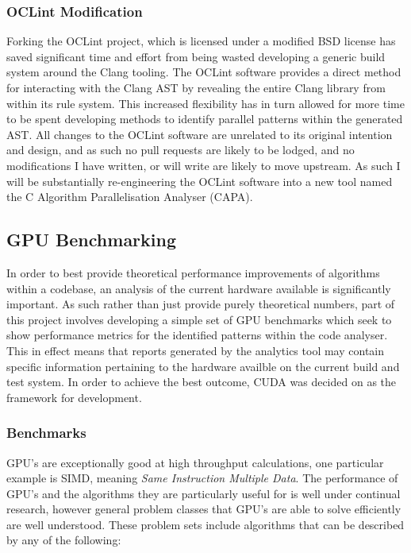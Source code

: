 \subsubsection{OCLint Modification}
Forking the OCLint project, which is licensed under a modified BSD license has saved significant time and effort from being wasted developing a generic build system around the Clang tooling. The OCLint software provides a direct method for interacting with the Clang AST by revealing the entire Clang library from within its rule system. This increased flexibility has in turn allowed for more time to be spent developing methods to identify parallel patterns within the generated AST. All changes to the OCLint software are unrelated to its original intention and design, and as such no pull requests are likely to be lodged, and no modifications I have written, or will write are likely to move upstream. As such I will be substantially re-engineering the OCLint software into a new tool named the C Algorithm Parallelisation Analyser (CAPA).

\subsection{GPU Benchmarking}
In order to best provide theoretical performance improvements of algorithms within a codebase, an analysis of the current hardware available is significantly important. As such rather than just provide purely theoretical numbers, part of this project involves developing a simple set of GPU benchmarks which seek to show performance metrics for the identified patterns within the code analyser. This in effect means that reports generated by the analytics tool may contain specific information pertaining to the hardware availble on the current build and test system. In order to achieve the best outcome, CUDA was decided on as the framework for development.

\subsubsection{Benchmarks}
GPU's are exceptionally good at high throughput calculations, one particular example is SIMD, meaning \emph{Same Instruction Multiple Data}. The performance of GPU's and the algorithms they are particularly useful for is well under continual research, however general problem classes that GPU's are able to solve efficiently are well understood. These problem sets include algorithms that can be described by any of the following:

